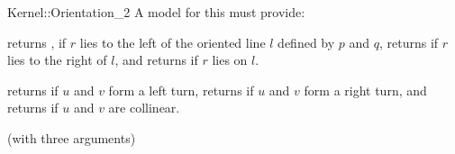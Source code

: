 \begin{ccRefFunctionObjectConcept}{Kernel::Orientation_2}
A model for this must provide:


{returns , if $r$ lies to the left of the oriented 
line $l$ defined by $p$ and $q$, returns  if $r$ 
lies to the right of $l$, and returns  if $r$ lies
on $l$.}

{returns  if $u$ and $v$ form a left turn,
returns  if $u$ and $v$ form a right turn,
and returns  if $u$ and $v$ are collinear.}

\ccRefines
{} (with three arguments)

\ccSeeAlso
{}\\

\end{ccRefFunctionObjectConcept}
